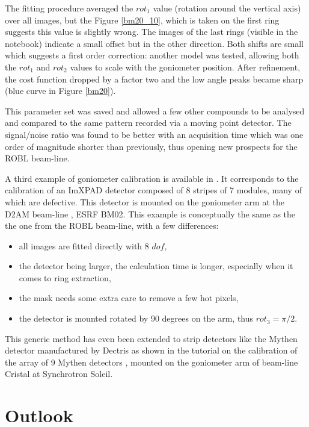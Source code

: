 \documentclass[preprint]{iucr}              %
\begin{document}
The fitting procedure averaged the $rot_1$ value (rotation around the vertical axis) over all images,
but the Figure \ref{bm20_10}, which is taken on the first ring suggests this value is slightly wrong.
The images of the last rings (visible in the notebook) indicate a small offset but in the other direction.
Both shifts are small which suggests a first order correction:
another model was tested, allowing both the $rot_1$ and $rot_2$ values to scale with the 
goniometer position. 
After refinement, the cost function dropped by a factor two and
the low angle peaks became sharp (blue curve in Figure \ref{bm20}). 

This parameter set was saved and allowed a few other compounds to be analysed and
compared to the same pattern recorded via a moving point detector. 
The signal/noise ratio was found to be better with an acquisition time which was one order
of magnitude shorter than previously, thus opening new prospects for
the ROBL beam-line.

A third example of goniometer calibration is available in \cite{rotation_xpad}. 
It corresponds to the calibration of an ImXPAD detector \cite{BOUDET200341}
composed of 8 stripes of 7 modules, many of which are defective.
This detector is mounted on the goniometer arm at the D2AM beam-line
\cite{Ferrer:ri0008}, ESRF BM02. 
This example is conceptually the same as the the one from the ROBL beam-line,
with a few differences:
\begin{itemize}
  \item all images are fitted directly with 8 $dof$,
  \item the detector being larger, the calculation time is
        longer, especially when it comes to ring extraction,
  \item the mask needs some extra care to remove a few hot pixels,
  \item the detector is mounted rotated by 90 degrees on the arm, thus $rot_3=\pi/2$.
\end{itemize}

This generic method has even been extended to strip detectors 
like the Mythen detector manufactured by Dectris as shown in the tutorial on the 
calibration of the array of 9 Mythen detectors \cite{rotation_mythen}, mounted on 
the goniometer arm of beam-line Cristal at Synchrotron Soleil.  

\section{Outlook}
\end{document}
